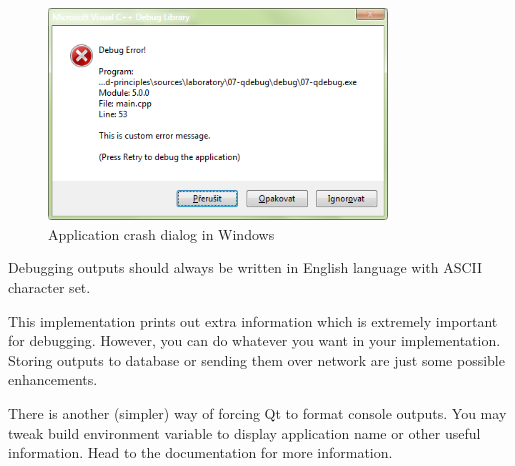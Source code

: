 \begin{figure}[ht]
\centering\includegraphics[width=9cm]{graphics/laboratory/11-debugdialog.png}
\caption{Application crash dialog in Windows}\label{figure:errordialog}
\end{figure}

\begin{fdocextra}
Debugging outputs should always be written in English language with ASCII character set.
\end{fdocextra}

This implementation prints out extra information which is extremely important for debugging. However, you can do whatever you want in your implementation. Storing outputs to database or sending them over network are just some possible enhancements.

There is another (simpler) way of forcing Qt to format console outputs. You may tweak build environment variable to display application name or other useful information. Head to the documentation \citep{various:qtdoc} for more information.
%
